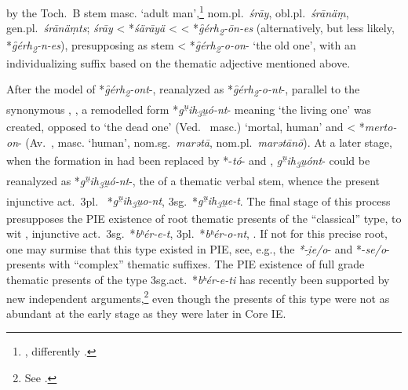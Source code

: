 \documentclass[output=paper,colorlinks,citecolor=brown]{langscibook}
\begin{document}
by the Toch.\ B stem  masc. ‘adult man’,\footnote{\citealt[441, 484]{Pinault2008}, differently \citealt[705]{Adams2013}.}  nom.pl.\ \textit{śrāy}, obl.pl.\ \textit{śrānäṃ}, gen.pl.\ \textit{śrānäṃts}; \textit{śrāy} < *\textit{śärāyä} <  < *\textit{g̑érh\textsubscript{2}-ōn-es} (alternatively, but less likely, *\textit{g̑érh\textsubscript{2}-n-es}), presupposing as stem  < *\textit{g̑érh\textsubscript{2}-o-on}- ‘the old one’, with an individualizing suffix based on the thematic adjective mentioned above. 

After the model of *\textit{g̑érh\textsubscript{2}-ont}-, reanalyzed as *\textit{g̑érh\textsubscript{2}-o-nt}-, parallel to the synonymous , , a remodelled form  *\textit{g\textsuperscript{u̯}ih\textsubscript{3}u̯ó-nt}- meaning ‘the living one’ was created, opposed to  ‘the dead one’ (Ved.\   masc.) ‘mortal, human’ and  < *\textit{merto-on}- (Av.\  , masc. ‘human’, nom.sg.\ \textit{marətā}, nom.pl.\ \textit{marətānō}). At a later stage, when the  formation in  had been replaced by *-\textit{tó}-  and ,  \textit{g\textsuperscript{u̯}ih\textsubscript{3}u̯ónt}- could be reanalyzed as  *\textit{g\textsuperscript{u̯}ih\textsubscript{3}u̯ó-nt}-, the  of a thematic verbal stem, whence the present injunctive act.\ 3pl.\   *\textit{g\textsuperscript{u̯}ih\textsubscript{3}u̯o-nt}, 3sg.\ *\textit{g\textsuperscript{u̯}ih\textsubscript{3}u̯e-t}.  The final stage of this process presupposes the PIE existence of root thematic presents of the “classical” type, to wit , injunctive act.\ 3sg.\ *\textit{bʰér-e-t}, 3pl.\ *\textit{bʰér-o-nt},  .  If not for this precise root, one may surmise that this type existed in PIE, see, e.g., the \textit{*-i̯e/o}- and *-\textit{s\kinvbreve e/o}-presents with “complex” thematic suffixes.  The PIE existence of full grade thematic presents of the type 3sg.act.\ *\textit{bʰér-e-ti} has recently been supported by new independent arguments,\footnote{See \citealt[72--78]{Jasanoff2023}.} even though the presents of this type were not as abundant at the early stage as they were later in Core IE.  
\end{document}
